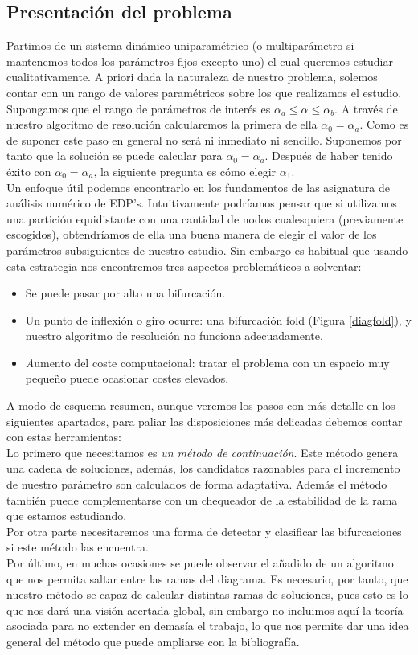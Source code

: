 \subsection{Presentación del problema}
Partimos de un sistema dinámico uniparamétrico (o multiparámetro si mantenemos todos los parámetros fijos excepto uno) el cual queremos estudiar cualitativamente. A priori dada la naturaleza de nuestro problema, solemos contar con un rango de valores paramétricos sobre los que realizamos el estudio.\\
Supongamos que el rango de parámetros de interés es $\alpha_a \leq \alpha \leq \alpha_b $. A través de nuestro algoritmo de resolución calcularemos la primera de ella $\alpha_0=\alpha_a$. Como es de suponer este paso en general no será ni inmediato ni sencillo.  
Suponemos por tanto que la solución se puede calcular para  $\alpha_0=\alpha_a$.
Después de haber tenido éxito con  $\alpha_0=\alpha_a$, la siguiente pregunta es cómo elegir  $\alpha_1$.\\Un enfoque útil podemos encontrarlo en los fundamentos de las asignatura de análisis numérico de EDP's. Intuitivamente podríamos pensar que si utilizamos una partición equidistante con una cantidad de nodos cualesquiera (previamente escogidos), obtendríamos de ella una buena manera de elegir el valor de los parámetros subsiguientes de nuestro estudio.
Sin embargo es habitual que usando esta estrategia nos encontremos tres aspectos problemáticos a solventar:
\begin{itemize}
	\item  Se puede pasar por alto una bifurcación.
	\item  Un punto de inflexión o giro ocurre: una bifurcación fold (Figura \ref{diagfold}), y nuestro algoritmo de resolución no funciona adecuadamente.
	\item \textit Aumento del coste computacional: tratar el problema con un espacio muy pequeño puede ocasionar costes elevados.
\end{itemize}
A modo de esquema-resumen, aunque veremos los pasos con más detalle en los siguientes apartados, para paliar las disposiciones más delicadas debemos contar con estas herramientas: \\
Lo primero que necesitamos es \textit{un método de continuación}. Este método genera una cadena de soluciones, además, los candidatos razonables para el incremento de nuestro parámetro son calculados de forma adaptativa. Además el método también puede complementarse con un chequeador de la estabilidad de la rama que estamos estudiando.\\
Por otra parte necesitaremos una forma de detectar y clasificar las bifurcaciones si este método las encuentra.\\
Por último, en muchas ocasiones se puede observar el añadido de un algoritmo que nos permita saltar entre las ramas del diagrama. Es necesario, por tanto, que nuestro método se capaz de calcular distintas ramas de soluciones, pues esto es lo que nos dará una visión acertada global, sin embargo no incluimos aquí la teoría asociada para no extender en demasía el trabajo,  lo que nos permite dar una idea general del método que puede ampliarse con la bibliografía.

